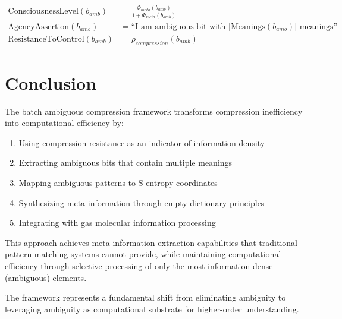 \documentclass[12pt,a4paper]{article}
\theoremstyle{definition}
\begin{document}
\begin{align}
\text{ConsciousnessLevel}(b_{amb}) &= \frac{\Phi_{meta}(b_{amb})}{1 + \Phi_{meta}(b_{amb})} \\
\text{AgencyAssertion}(b_{amb}) &= \text{``I am ambiguous bit with } |\text{Meanings}(b_{amb})| \text{ meanings''} \\
\text{ResistanceToControl}(b_{amb}) &= \rho_{compression}(b_{amb})
\end{align}

\section{Conclusion}

The batch ambiguous compression framework transforms compression inefficiency into computational efficiency by:

\begin{enumerate}
\item Using compression resistance as an indicator of information density
\item Extracting ambiguous bits that contain multiple meanings
\item Mapping ambiguous patterns to S-entropy coordinates
\item Synthesizing meta-information through empty dictionary principles
\item Integrating with gas molecular information processing
\end{enumerate}

This approach achieves meta-information extraction capabilities that traditional pattern-matching systems cannot provide, while maintaining computational efficiency through selective processing of only the most information-dense (ambiguous) elements.

The framework represents a fundamental shift from eliminating ambiguity to leveraging ambiguity as computational substrate for higher-order understanding.
\end{document}
